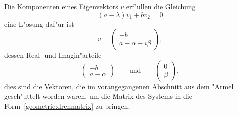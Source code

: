 Die Komponenten eines Eigenvektors $v$ erf"ullen die Gleichung
\[
(a-\lambda)v_1 + bv_2=0
\]
eine L"osung daf"ur ist
\[
v=\begin{pmatrix}
-b\\
a-\alpha-i\beta
\end{pmatrix},
\]
dessen Real- und Imagin"arteile
\[
\begin{pmatrix}
-b\\a-\alpha
\end{pmatrix}
\qquad\text{und}\qquad
\begin{pmatrix}
0\\\beta
\end{pmatrix},
\]
dies sind die Vektoren, die im vorangegangenen Abschnitt aus dem "Armel
gesch"uttelt worden waren, um die Matrix des Systems in die
Form~\eqref{geometrie:drehmatrix} zu bringen.

